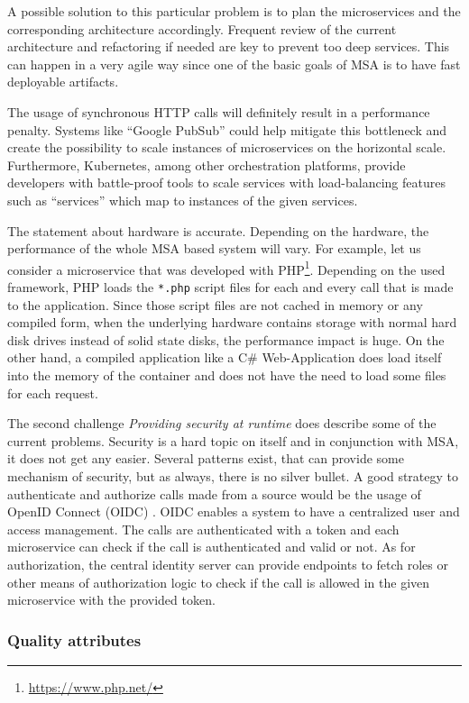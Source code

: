 A possible solution to this particular problem is to plan
the microservices and the corresponding architecture accordingly.
Frequent review of the current architecture and refactoring \cite{zio:ARforCloud}
if needed are key to prevent too deep services. This can happen
in a very agile way since one of the basic goals of MSA is
to have fast deployable artifacts.

The usage of synchronous HTTP calls will definitely result
in a performance penalty. Systems like ``Google PubSub'' could help
mitigate this bottleneck and create the possibility to scale
instances of microservices on the horizontal scale.
Furthermore, Kubernetes, among other orchestration platforms, provide developers with
battle-proof tools to scale services with load-balancing features
such as ``services'' which map to instances of the given services.

The statement about hardware is accurate. Depending on the hardware,
the performance of the whole MSA based system will vary. For example,
let us consider a microservice that was developed with
PHP\footnote{\url{https://www.php.net/}}. Depending on the used framework,
PHP loads the \texttt{*.php} script files for each and every call that
is made to the application. Since those script files are not cached
in memory or any compiled form, when the underlying hardware contains
storage with normal hard disk drives instead of solid state disks,
the performance impact is huge. On the other hand, a compiled application
like a C\# Web-Application does load itself into the memory of the
container and does not have the need to load some files for each request.

The second challenge \textit{Providing security at runtime} does
describe some of the current problems. Security is a hard topic
on itself and in conjunction with MSA, it does not get any easier.
Several patterns exist, that can provide some mechanism of security,
but as always, there is no silver bullet. A good strategy to
authenticate and authorize calls made from a source would be the usage
of OpenID Connect (OIDC) \cite{Siriwardena:OIDC}. OIDC enables
a system to have a centralized user and access management. The
calls are authenticated with a token and each microservice can check
if the call is authenticated and valid or not. As for authorization,
the central identity server can provide endpoints to fetch roles
or other means of authorization logic to check if the call is allowed
in the given microservice with the provided token.

\subsubsection{Quality attributes}


